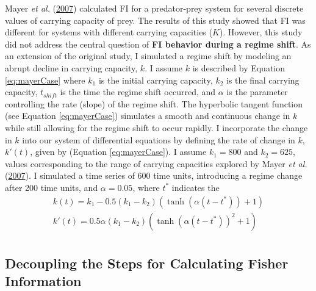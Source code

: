 \documentclass[print]{nuthesis}
\begin{document}
Mayer \emph{et al.} (\protect\hyperlink{ref-mayer_applications_2007}{2007}) calculated FI for a predator-prey system for several discrete values of carrying capacity of prey. The results of this study showed that FI was different for systems with different carrying capacities (\(K\)). However, this study did not address the central question of \textbf{FI behavior during a regime shift}. As an extension of the original study, I simulated a regime shift by modeling an abrupt decline in carrying capacity, \(k\). I assume \(k\) is described by Equation \eqref{eq:mayerCase} where \(k_1\) is the initial carrying capacity, \(k_2\) is the final carrying capacity, \(t_{shift}\) is the time the regime shift occurred, and \(\alpha\) is the parameter controlling the rate (slope) of the regime shift. The hyperbolic tangent function (see Equation \eqref{eq:mayerCase}) simulates a smooth and continuous change in \(k\) while still allowing for the regime shift to occur rapidly. I incorporate the change in \(k\) into our system of differential equations by defining the rate of change in \(k\), \(k'(t)\), given by (Equation \eqref{eq:mayerCase}). I assume \(k_1=800\) and \(k_2=625\), values corresponding to the range of carrying capacities explored by Mayer \emph{et al.} (\protect\hyperlink{ref-mayer_applications_2007}{2007}). I simulated a time series of 600 time units, introducing a regime change after 200 time units, and \(\alpha=0.05\), where \(t^*\) indicates the
\begin{equation}  
\begin{array}{rcr}
  k(t) = k_1  - 0.5(k_1-k_2)(\tanh(\alpha (t-t^*))+1) \\ 
  k'(t) = 0.5\alpha (k_1-k_2)(\tanh(\alpha(t-t^*))^2 +1) \\
\label{eq:mayerCase}
\end{array}
\end{equation}
\hypertarget{decoupling-the-steps-for-calculating-fisher-information}{%
\subsection{Decoupling the Steps for Calculating Fisher Information}\label{decoupling-the-steps-for-calculating-fisher-information}}
\end{document}
